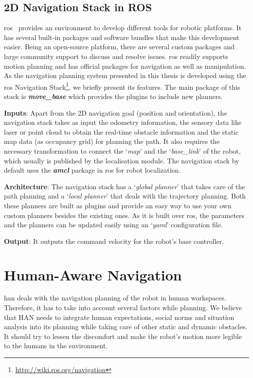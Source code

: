 \subsection{2D Navigation Stack in ROS}
\acrfull{ros}~\cite{quigley2009ros} provides an environment to develop different tools for robotic platforms. It has several built-in packages and software bundles that make this development easier. Being an open-source platform, there are several custom packages and large community support to discuss and resolve issues. \acrshort{ros} readily supports motion planning and has official packages for navigation as well as manipulation. As the navigation planning system presented in this thesis is developed using the \acrshort{ros} Navigation Stack\footnote{\url{http://wiki.ros.org/navigation}}, we briefly present its features. The main package of this stack is \textit{\textbf{move\_base}} which provides the plugins to include new planners.

\textbf{Inputs}: Apart from the 2D navigation goal (position and orientation), the navigation stack takes as input the odometry information, the sensory data like laser or point cloud to obtain the real-time obstacle information and the static map data (as occupancy grid) for planning the path. It also requires the necessary transformation to connect the `\textit{map}' and the `\textit{base\_link}' of the robot, which usually is published by the localisation module. The navigation stack by default uses the \textbf{\textit{amcl}} package in \acrshort{ros} for robot localization. 

\textbf{Architecture}: The navigation stack has a `\textit{global planner}' that takes care of the path planning and a `\textit{local planner}' that deals with the trajectory planning. Both these planners are built as plugins and provide an easy way to use your own custom planners besides the existing ones. As it is built over \acrshort{ros}, the parameters and the planners can be updated easily using an `\textit{yaml}' configuration file. 

\textbf{Output}: It outputs the command velocity for the robot's base controller.


\section{Human-Aware Navigation}
\acrfull{han} deals with the navigation planning of the robot in human workspaces. Therefore, it has to take into account several factors while planning. We believe that HAN needs to integrate human expectations, social norms and situation analysis into its planning while taking care of other static and dynamic obstacles. It should try to lessen the discomfort and make the robot's motion more legible to the humans in the environment. 

